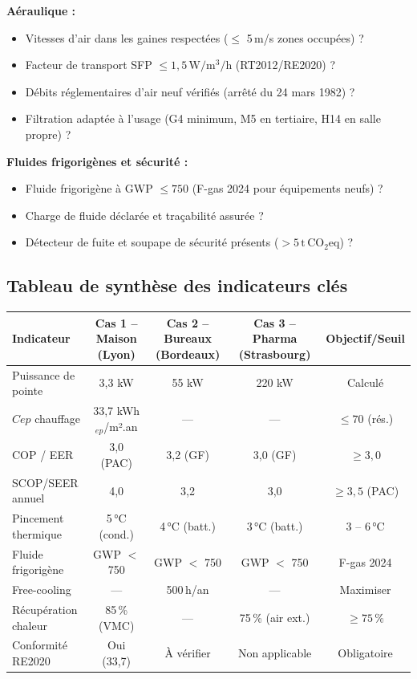 \begin{methode}[title={Check-list de vérification — Note de calcul CVC}]
\textbf{Aéraulique :}
\begin{itemize}
  \item[$\square$] Vitesses d'air dans les gaines respectées ($\leq$ 5\,m/s zones occupées) ?
  \item[$\square$] Facteur de transport SFP $\leq 1{,}5\,\si{\watt\per\metre\cubed\per\hour}$ (RT2012/RE2020) ?
  \item[$\square$] Débits réglementaires d'air neuf vérifiés (arrêté du 24 mars 1982) ?
  \item[$\square$] Filtration adaptée à l'usage (G4 minimum, M5 en tertiaire, H14 en salle propre) ?
\end{itemize}

\textbf{Fluides frigorigènes et sécurité :}
\begin{itemize}
  \item[$\square$] Fluide frigorigène à GWP $\leq 750$ (F-gas 2024 pour équipements neufs) ?
  \item[$\square$] Charge de fluide déclarée et traçabilité assurée ?
  \item[$\square$] Détecteur de fuite et soupape de sécurité présents ($> 5\,\mathrm{t\,CO_2eq}$) ?
\end{itemize}
\end{methode}

\subsection{Tableau de synthèse des indicateurs clés}

\begin{center}
\begin{tabular}{lcccc}
  \toprule
  Indicateur & Cas 1 -- Maison (Lyon) & Cas 2 -- Bureaux (Bordeaux) & Cas 3 -- Pharma (Strasbourg) & Objectif/Seuil \\
  \midrule
  Puissance de pointe & 3,3 kW & 55 kW & 220 kW & Calculé \\
  $Cep$ chauffage & 33,7 kWh$_{ep}$/m².an & — & — & $\leq 70$ (rés.) \\
  COP / EER & 3,0 (PAC) & 3,2 (GF) & 3,0 (GF) & $\geq 3,0$ \\
  SCOP/SEER annuel & 4,0 & 3,2 & 3,0 & $\geq 3,5$ (PAC) \\
  Pincement thermique & 5\,°C (cond.) & 4\,°C (batt.) & 3\,°C (batt.) & 3 -- 6\,°C \\
  Fluide frigorigène & GWP $<$ 750 & GWP $<$ 750 & GWP $<$ 750 & F-gas 2024 \\
  Free-cooling & — & 500\,h/an & — & Maximiser \\
  Récupération chaleur & 85\,\% (VMC) & — & 75\,\% (air ext.) & $\geq 75\,\%$ \\
  Conformité RE2020 & Oui (33,7) & À vérifier & Non applicable & Obligatoire \\
  \bottomrule
\end{tabular}
\end{center}

